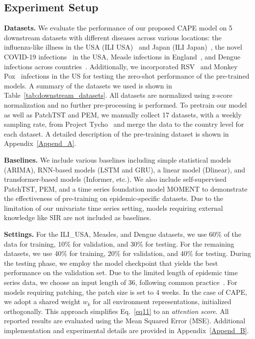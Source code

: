 \subsection{Experiment Setup}
\textbf{Datasets.} We evaluate the performance of our proposed CAPE model on 5 downstream datasets with different diseases across various locations: the influenza-like illness in the USA (ILI USA)~\cite{cdc_ili_usa} and Japan (ILI Japan)~\cite{cdc_ili_japan}, the novel COVID-19 infections~\cite{dong2020interactive} in the USA, Measle infections in England~\cite{lau2020competing}, and Dengue infections across countries~\cite{opendengue}. Additionally, we incorporated RSV~\cite{cdc_rsv} and Monkey Pox~\cite{cdc_monkeypox} infections in the US for testing the zero-shot performance of the pre-trained models.
A summary of the datasets we used is shown in Table~\ref{tab:downstream_datasets}. All datasets are normalized using z-score normalization and no further pre-processing is performed. To pretrain our model as well as PatchTST and PEM, we manually collect 17 datasets, with a weekly sampling rate, from Project Tycho~\cite{van2018project} and merge the data to the country level for each dataset. A detailed description of the pre-training dataset is shown in Appendix~\ref{Append_A}.

\textbf{Baselines.} We include various baselines including simple statistical models (ARIMA), RNN-based models (LSTM and GRU), a linear model (Dlinear), and transformer-based models (Informer, etc.). We also include self-supervised PatchTST, PEM, and a time series foundation model MOMENT to demonstrate the effectiveness of pre-training on epidemic-specific datasets. Due to the limitation of our univariate time series setting, models requiring external knowledge like SIR are not included as baselines.

\textbf{Settings.} 
For the ILI\_USA, Measles, and Dengue datasets, we use 60\% of the data for training, 10\% for validation, and 30\% for testing. For the remaining datasets, we use 40\% for training, 20\% for validation, and 40\% for testing. During the testing phase, we employ the model checkpoint that yields the best performance on the validation set.
Due to the limited length of epidemic time series data, we choose an input length of 36, following common practice~\cite{wu2023timesnet, wang2024tssurvey}. For models requiring patching, the patch size is set to 4 weeks. In the case of CAPE, we adopt a shared weight $w_k$ for all environment representations, initialized orthogonally. This approach simplifies Eq.~\ref{eq11} to an \textit{attention score}.
All reported results are evaluated using the Mean Squared Error (MSE). Additional implementation and experimental details are provided in Appendix~\ref{Append_B}.

